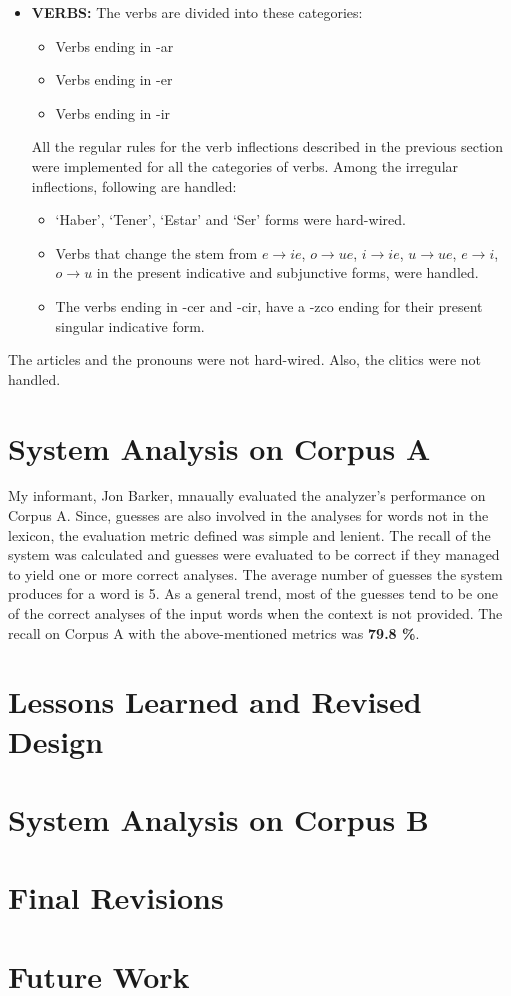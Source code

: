 \documentclass[11pt,letterpaper]{article}
\begin{document}
\begin{itemize}
\item
{\bf VERBS:} The verbs are divided into these categories:
\begin{itemize}
\item Verbs ending in -ar
\item Verbs ending in -er
\item Verbs ending in -ir
\end{itemize}
All the regular rules for the verb inflections described in the previous section were implemented for all the categories of verbs. Among the irregular inflections, following are handled:
\begin{itemize}
\item `Haber', `Tener', `Estar' and `Ser' forms were hard-wired.
\item Verbs that change the stem from $e \rightarrow ie$, $o \rightarrow ue$, $i \rightarrow ie$, $u \rightarrow ue$, $e \rightarrow i$, $o \rightarrow u$  in the present indicative and subjunctive forms, were handled. 
\item The verbs ending in -cer and -cir, have a -zco ending for their present singular indicative form.
\end{itemize}

\end{itemize}

The articles and the pronouns were not hard-wired. Also, the clitics were not handled.
\section{System Analysis on Corpus A}
My informant, Jon Barker, mnaually evaluated the analyzer's performance on Corpus A. Since, guesses are also involved in the analyses for words not in the lexicon, the evaluation metric defined was simple and lenient. The recall of the system was calculated and guesses were evaluated to be correct if they managed to yield one or more correct analyses. The average number of guesses the system produces for a word is 5. As a general trend, most of the guesses tend to be one of the correct analyses of the input words when the context is not provided.
The recall on Corpus A with the above-mentioned metrics was {\bf 79.8 \%}. 


\section{Lessons Learned and Revised Design}

\section{System Analysis on Corpus B}

\section{Final Revisions}

\section{Future Work}







\label{lastpage}
\end{document}
